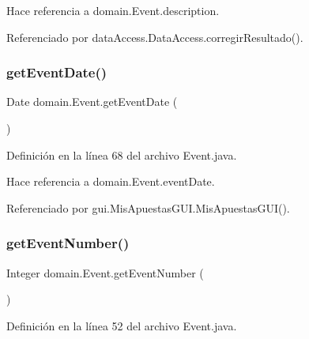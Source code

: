 Hace referencia a domain.\+Event.\+description.



Referenciado por data\+Access.\+Data\+Access.\+corregir\+Resultado().

\mbox{\label{classdomain_1_1Event_ac0959d1f92fa9081b0a883c3d60e6dfa}} 
\subsubsection{\texorpdfstring{getEventDate()}{getEventDate()}}
{\footnotesize\ttfamily Date domain.\+Event.\+get\+Event\+Date (\begin{DoxyParamCaption}{ }\end{DoxyParamCaption})}



Definición en la línea 68 del archivo Event.\+java.


\begin{DoxyCode}{0}

\end{DoxyCode}


Hace referencia a domain.\+Event.\+event\+Date.



Referenciado por gui.\+Mis\+Apuestas\+G\+U\+I.\+Mis\+Apuestas\+G\+U\+I().

\mbox{\label{classdomain_1_1Event_a8b5055f21582c239b4e315e0c6050cb4}} 
\subsubsection{\texorpdfstring{getEventNumber()}{getEventNumber()}}
{\footnotesize\ttfamily Integer domain.\+Event.\+get\+Event\+Number (\begin{DoxyParamCaption}{ }\end{DoxyParamCaption})}



Definición en la línea 52 del archivo Event.\+java.


